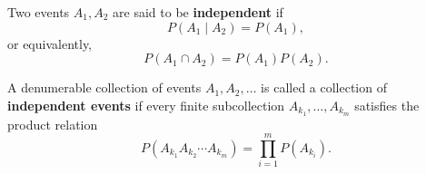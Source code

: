 Two events $A_1, A_2$ are said to be \textbf{independent} if
$$P(A_1 \mid A_2) = P(A_1),$$
or equivalently,
$$P(A_1 \cap A_2) = P(A_1) P(A_2).$$

A denumerable collection of events $A_1, A_2, \ldots$ is called a collection of \textbf{independent events} if every finite subcollection $A_{k_1}, \ldots, A_{k_m}$ satisfies the product relation
$$P(A_{k_1} A_{k_2} \cdots A_{k_m}) = \prod_{i=1}^{m} P(A_{k_i}).$$

